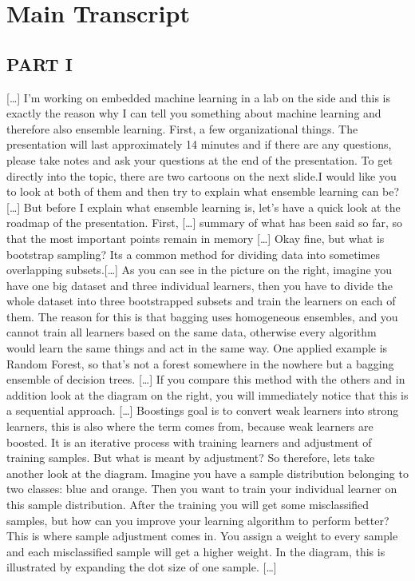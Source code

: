 \chapter{Main Transcript}

\section{PART I}

[\dots] I'm working on embedded machine learning in a lab on the side and this is exactly the reason why I can tell you something about machine learning and therefore also ensemble learning. First, a few organizational things. The presentation will last approximately 14 minutes and if there are any questions, please take notes and ask your questions at the end of the presentation. To get directly into the topic, there are two cartoons on the next slide.I would like you to look at both of them and then try to explain what ensemble learning can be? [\dots] But before I explain what ensemble learning is, let's have a quick look at the roadmap of the presentation. First, [\dots] summary of what has been said so far, so that the most important points remain in memory [\dots] Okay fine, but what is bootstrap sampling? Its a common method for dividing data into sometimes overlapping subsets.[\dots] As you can see in the picture on the right, imagine you have one big dataset and three individual learners, then you have to divide the whole dataset into three bootstrapped subsets and train the learners on each of them. The reason for this is that bagging uses homogeneous ensembles, and you cannot train all learners based on the same data, otherwise every algorithm would learn the same things and act in the same way. One applied example is Random Forest, so that's not a forest somewhere in the nowhere but a bagging ensemble of decision trees. [\dots] If you compare this method with the others and in addition look at the diagram on the right, you will immediately notice that this is a sequential approach. [\dots] Boostings goal is to convert weak learners into strong learners, this is also where the term comes from, because weak learners are boosted.  It is an iterative process with training learners and adjustment of training samples. But what is meant by adjustment? So therefore, lets take another look at the diagram. Imagine you have a sample distribution belonging to two classes: blue and orange. Then you want to train your individual learner on this sample distribution. After the training you will get some misclassified samples, but how can you improve your learning algorithm to perform better? This is where sample adjustment comes in. You assign a weight to every sample and each misclassified sample will get a higher weight. In the diagram, this is illustrated by expanding the dot size of one sample. [\dots]

